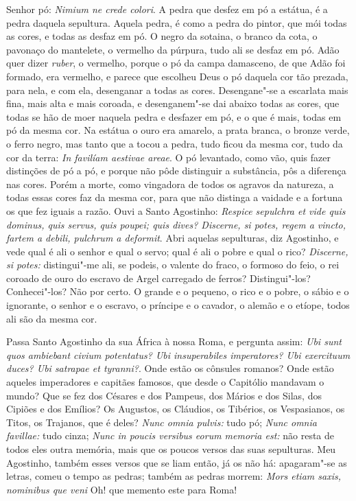 Senhor pó: \emph{Nimium ne crede colori}. A pedra que desfez em pó a
estátua, é a pedra daquela sepultura. Aquela pedra, é como a pedra do
pintor, que mói todas as cores, e todas as desfaz em pó. O negro da
sotaina, o branco da cota, o pavonaço do mantelete, o vermelho da
púrpura, tudo ali se desfaz em pó. Adão quer dizer \emph{ruber}, o
vermelho, porque o pó da campa damasceno, de que Adão foi formado, era
vermelho, e parece que escolheu Deus o pó daquela
cor tão prezada, para nela, e com ela, desenganar a todas as cores.
Desengane"-se a escarlata mais fina, mais alta e mais coroada, e
desenganem"-se dai abaixo todas as cores, que todas se hão de moer
naquela pedra e desfazer em pó, e o que é mais, todas em pó da mesma
cor. Na estátua o ouro era amarelo, a prata branca, o bronze verde, o
ferro negro, mas tanto que a tocou a pedra, tudo ficou da mesma cor,
tudo da cor da terra: \emph{In favilíam aestivae areae}. O pó levantado,
como vão, quis fazer distinções de pó a pó, e porque não
pôde distinguir a substância, pôs a diferença nas cores. Porém a morte,
como vingadora de todos os agravos da natureza, a todas essas cores faz
da mesma cor, para que não distinga a vaidade e a fortuna os que fez
iguais a razão. Ouvi a Santo Agostinho: \emph{Respice sepulchra et vide
quis dominus, quis servus, quis poupei; quis dives? Discerne, si potes,
regem a vincto, fartem a debili, pulchrum a deformit}. Abri aquelas
sepulturas, diz Agostinho, e vede qual é ali o senhor e qual o servo;
qual é ali o pobre e qual o rico? \emph{Discerne, si potes:}
distingui"-me ali, se podeis, o valente do fraco, o formoso do feio, o
rei coroado de ouro do escravo de Argel carregado de ferros?
Distingui"-los? Conhecei"-los? Não por certo. O grande e o pequeno, o rico
e o pobre, o sábio e o ignorante, o senhor e o escravo, o príncipe e o
cavador, o alemão e o etíope, todos ali são da mesma cor.

Passa Santo Agostinho da sua África à nossa Roma, e pergunta
assim: \emph{Ubi sunt quos ambiebant civium potentatus? Ubi
insuperabiles imperatores? Ubi exercituum duces? Ubi satrapae et
tyranni?}. Onde estão os cônsules romanos? Onde estão aqueles
imperadores e capitães famosos, que desde o Capitólio mandavam o mundo?
Que se fez dos Césares e dos Pampeus, dos Mários e dos Silas, dos
Cipiões e dos Emílios? Os Augustos, os Cláudios, os Tibérios, os
Vespasianos, os Titos, os Trajanos, que é deles? \emph{Nunc omnia
pulvis:} tudo pó; \emph{Nunc omnia favillae:} tudo cinza; \emph{Nunc in
poucis versibus eorum memoria est:} não resta de todos eles outra
memória, mais que os poucos versos das suas sepulturas. Meu Agostinho,
também esses versos que se liam então, já os não há: apagaram"-se as
letras, comeu o tempo as pedras; também as pedras morrem: \emph{Mors
etiam saxis, nominibus que veni} Oh! que memento este para Roma!

